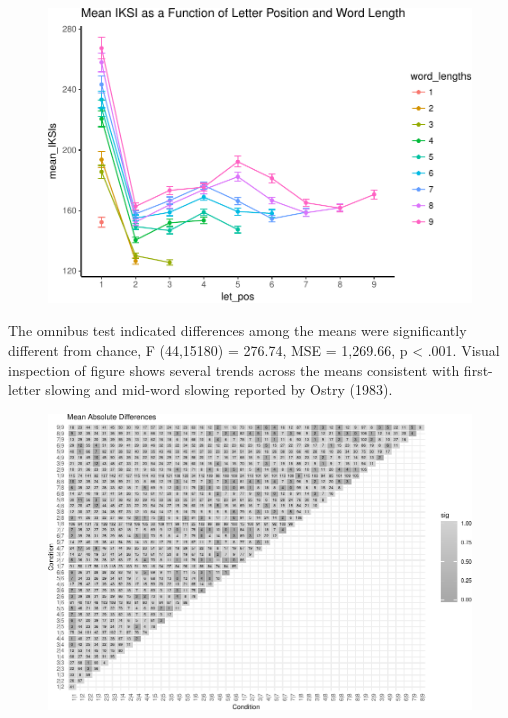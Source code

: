 \documentclass[man]{apa6}
\theoremstyle{definition}
\theoremstyle{definition}
\theoremstyle{definition}
\theoremstyle{remark}
\begin{document}
\begin{figure}[htbp]
\centering
\includegraphics{Entropy_typing_draft_files/figure-latex/typing_mean_iksis_plot-1.pdf}
\caption{}
\end{figure}

The omnibus test indicated differences among the means were
significantly different from chance, F (44,15180) = 276.74, MSE =
1,269.66, p \textless{} .001. Visual inspection of figure shows several
trends across the means consistent with first-letter slowing and
mid-word slowing reported by Ostry (1983).

\begin{figure}[htbp]
\centering
\includegraphics{Entropy_typing_draft_files/figure-latex/typing_mean_iksis_comparisons-1.pdf}
\caption{}
\end{figure}
\end{document}
